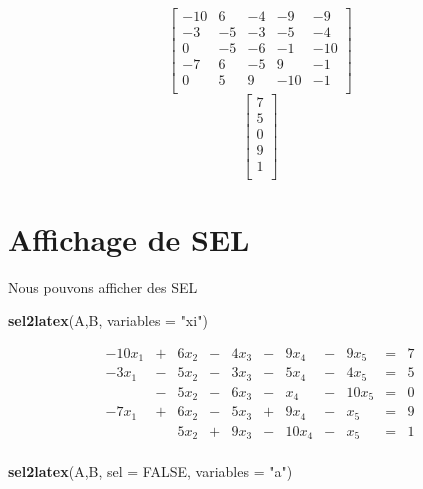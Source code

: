 \documentclass[]{article}
\newenvironment{Shaded}{\begin{snugshade}}{\end{snugshade}}
\newcommand{\DataTypeTok}[1]{\textcolor[rgb]{0.13,0.29,0.53}{#1}}
\newcommand{\KeywordTok}[1]{\textcolor[rgb]{0.13,0.29,0.53}{\textbf{#1}}}
\newcommand{\NormalTok}[1]{#1}
\newcommand{\OtherTok}[1]{\textcolor[rgb]{0.56,0.35,0.01}{#1}}
\newcommand{\StringTok}[1]{\textcolor[rgb]{0.31,0.60,0.02}{#1}}
\begin{document}
\[
 \left[
\begin{array}{rrrrr}
-10 & 6 & -4 & -9 & -9 \\ 
-3 & -5 & -3 & -5 & -4 \\ 
0 & -5 & -6 & -1 & -10 \\ 
-7 & 6 & -5 & 9 & -1 \\ 
0 & 5 & 9 & -10 & -1 \\ 
\end{array}
\right] 
\]\[
 \left[
\begin{array}{r}
7 \\ 
5 \\ 
0 \\ 
9 \\ 
1 \\ 
\end{array}
\right] 
\]

\hypertarget{affichage-de-sel}{%
\section{Affichage de SEL}\label{affichage-de-sel}}

Nous pouvons afficher des SEL

\begin{Shaded}
\begin{Highlighting}[]
\KeywordTok{sel2latex}\NormalTok{(A,B, }\DataTypeTok{variables =} \StringTok{"xi"}\NormalTok{)}
\end{Highlighting}
\end{Shaded}

\[
 \begin{array}{rrrrrrrrrrr}
-10 x_{1} & + & 6 x_{2} & - & 4 x_{3} & - & 9 x_{4} & - & 9 x_{5} & = & 7 \\ 
-3 x_{1} & - & 5 x_{2} & - & 3 x_{3} & - & 5 x_{4} & - & 4 x_{5} & = & 5 \\ 
& - & 5 x_{2} & - & 6 x_{3} & - & x_{4} & - & 10 x_{5} & = & 0 \\ 
-7 x_{1} & + & 6 x_{2} & - & 5 x_{3} & + & 9 x_{4} & - & x_{5} & = & 9 \\ 
& & 5 x_{2} & + & 9 x_{3} & - & 10 x_{4} & - & x_{5} & = & 1 \\ 
\end{array} 
\]

\begin{Shaded}
\begin{Highlighting}[]
\KeywordTok{sel2latex}\NormalTok{(A,B, }\DataTypeTok{sel =} \OtherTok{FALSE}\NormalTok{, }\DataTypeTok{variables =} \StringTok{"a"}\NormalTok{)}
\end{Highlighting}
\end{Shaded}
\end{document}
